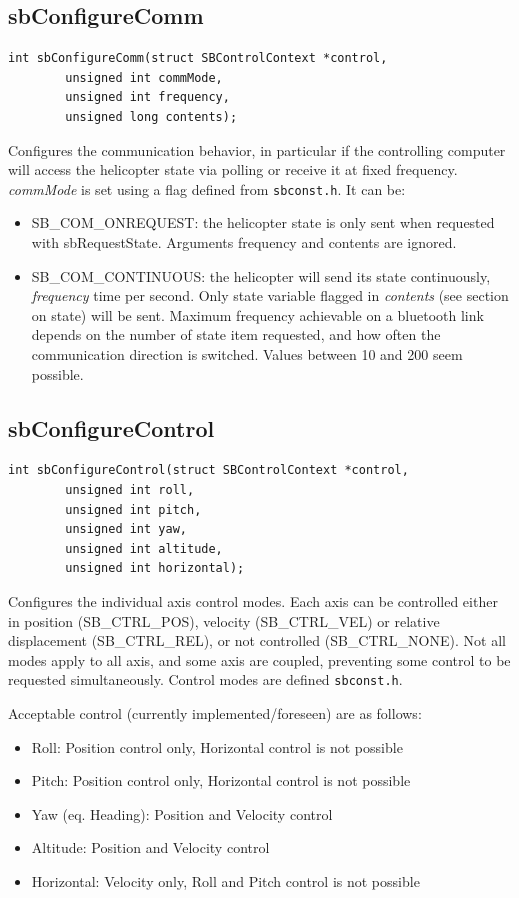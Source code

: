 \documentclass{article}
\renewcommand{\ref}[1]{\link{\htmlref{#1}}{#1}}
\begin{document}
\subsection{sbConfigureComm}
\label{sec:sbConfigureComm}
\begin{verbatim}
int sbConfigureComm(struct SBControlContext *control, 
        unsigned int commMode,
        unsigned int frequency,
        unsigned long contents);
\end{verbatim}
Configures the communication behavior, in particular if the controlling computer
will access the helicopter state via polling or receive it at fixed frequency.
{\em commMode} is set using a flag defined from {\tt sbconst.h}. It can be:
\begin{itemize}
\item SB\_COM\_ONREQUEST: the helicopter state is only sent when requested with
sbRequestState. Arguments frequency and contents are ignored.
\item SB\_COM\_CONTINUOUS: the helicopter will send its state continuously,
{\em frequency} time per second. Only state variable flagged in {\em contents}
(see section \ref{sec:state} on state) will be sent. Maximum frequency
achievable on a bluetooth link depends on the number of state item requested,
and how often the communication direction is switched. Values between 10 and
200 seem possible.
\end{itemize}

\subsection{sbConfigureControl}
\label{sec:sbConfigureControl}
\begin{verbatim}
int sbConfigureControl(struct SBControlContext *control, 
        unsigned int roll,
        unsigned int pitch,
        unsigned int yaw,
        unsigned int altitude,
        unsigned int horizontal);
\end{verbatim}
Configures the individual axis control modes. Each axis can be controlled
either in position (SB\_CTRL\_POS), velocity (SB\_CTRL\_VEL) or relative 
displacement (SB\_CTRL\_REL), or not controlled (SB\_CTRL\_NONE). 
Not all modes apply to all axis, and some axis are coupled, preventing some
control to be requested simultaneously.   
Control modes are defined {\tt sbconst.h}.

Acceptable control (currently implemented/foreseen) are as follows:
\begin{itemize}
\item Roll: Position control only, Horizontal control is not possible
\item Pitch: Position control only, Horizontal control is not possible
\item Yaw (eq. Heading): Position and Velocity control
\item Altitude: Position and Velocity control
\item Horizontal: Velocity only, Roll and Pitch control is not possible
\end{itemize}
\end{document}
